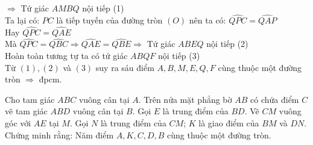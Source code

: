 \begin{bt}
{$\Rightarrow$ Tứ giác $AMBQ$ nội tiếp (1)\\
Ta lại có: $PC$ là tiếp tuyến của đường tròn $(O)$ nên ta có: $\widehat{QPC}=\widehat{QAP}$\\
Hay $\widehat{QPC}=\widehat{QAE}$\\
Mà $\widehat{QPC}=\widehat{QBC}\Rightarrow \widehat{QAE}=\widehat{QBE}\Rightarrow$ Tứ giác $ABEQ$ nội tiếp (2)\\
Hoàn toàn tương tự ta có tứ giác $ABQF$ nội tiếp (3)\\
Từ $(1),(2)$ và $(3)$ suy ra sáu điểm $A,B,M,E,Q,F$ cùng thuộc một đường tròn $\Rightarrow $ đpcm.        \\
        }
    \end{bt}
    
\begin{bt}%
        Cho tam giác $ABC$ vuông cân tại $A$. Trên nửa mặt phẳng bờ $AB$ có chứa điểm $C$ vẽ tam giác $ABD$ vuông cân tại $B$. Gọi $E$ là trung điểm của $BD$. Vẽ $CM$ vuông góc với $AE$ tại $M$. Gọi $N$ là trung điểm của $CM$; $K$ là giao điểm của $BM$ và $DN$.\\
        Chứng minh rằng: Năm điểm $A,K,C,D,B$ cùng thuộc một đường tròn.
\end{bt}
